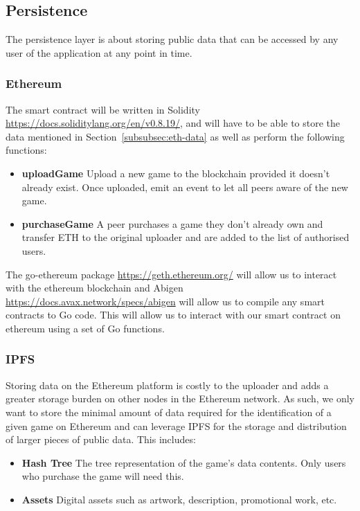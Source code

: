
\subsection{Persistence}

The persistence layer is about storing public data that can be accessed by any user of the application at any point in time.

\subsubsection*{Ethereum}

The smart contract will be written in Solidity \url{https://docs.soliditylang.org/en/v0.8.19/}, and will have to be able to store the data mentioned in Section~\ref{subsubsec:eth-data} as well as perform the following functions:

\begin{itemize}
  \item \textbf{uploadGame} Upload a new game to the blockchain provided it doesn't already exist. Once uploaded, emit an event to let all peers aware of the new game.
  \item \textbf{purchaseGame} A peer purchases a game they don't already own and transfer ETH to the original uploader and are added to the list of authorised users.
\end{itemize}

\vspace{2mm}\noindent
The go-ethereum package \url{https://geth.ethereum.org/} will allow us to interact with the ethereum blockchain and Abigen \url{https://docs.avax.network/specs/abigen} will allow us to compile any smart contracts to Go code. This will allow us to interact with our smart contract on ethereum using a set of Go functions.

\subsubsection*{IPFS}

Storing data on the Ethereum platform is costly to the uploader and adds a greater storage burden on other nodes in the Ethereum network. As such, we only want to store the minimal amount of data required for the identification of a given game on Ethereum and can leverage IPFS for the storage and distribution of larger pieces of public data.
\x
This includes:

\begin{itemize}
  \item \textbf{Hash Tree} The tree representation of the game's data contents. Only users who purchase the game will need this.
  \item \textbf{Assets} Digital assets such as artwork, description, promotional work, etc.  
\end{itemize}